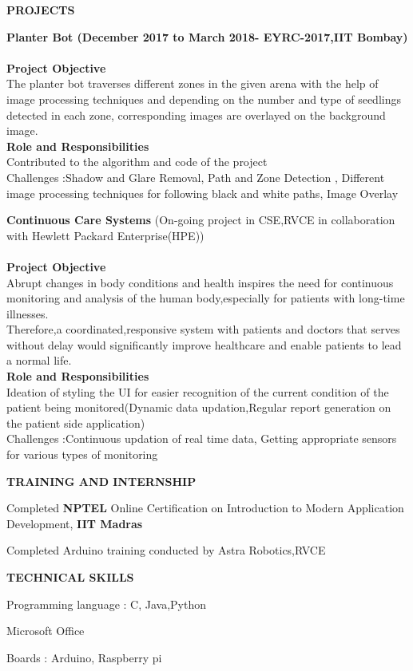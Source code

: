 \documentclass[letterpaper,11pt,oneside]{article}
\begin{document}
\vspace{5ex}

\noindent\textbf{{\normalsize PROJECTS}} \begin{enumerate}
	\item 
	\small {\textbf{Planter Bot (December 2017 to March 2018- EYRC-2017,IIT Bombay)}\\\\
		\textbf{Project Objective}\\
		The planter bot traverses different zones in the given arena with the help of image processing techniques
		and depending on the number and type of seedlings detected in each zone, corresponding images are overlayed on the background image.\\
		\textbf{Role and Responsibilities}\\
		Contributed to the algorithm and code of the project\\
		Challenges :Shadow and Glare Removal, Path and Zone Detection , Different image processing techniques for following black and white paths, Image Overlay
		
		\item \textbf{Continuous Care Systems}
		(On-going project in CSE,RVCE in collaboration with Hewlett Packard Enterprise(HPE))\\\\
		\textbf{Project Objective}\\
		Abrupt changes in body conditions and health inspires the need for continuous monitoring and analysis of the human body,especially for patients with long-time illnesses.\\
		Therefore,a coordinated,responsive system with patients and doctors that serves without delay would significantly improve healthcare and enable patients to lead a normal life.\\
		\textbf{Role and Responsibilities}\\
		Ideation of styling the UI for easier recognition of the current condition of the patient being monitored(Dynamic data updation,Regular report generation on the patient side application)\\
		Challenges :Continuous updation of real time data, Getting appropriate sensors for various types of monitoring
	}
	
\end{enumerate}

\vspace{2ex}

\noindent\textbf{{\normalsize  TRAINING AND INTERNSHIP}} \begin{itemize}
	\small {\item 	Completed \textbf{NPTEL} Online Certification on Introduction to Modern Application Development, \textbf{IIT Madras}
		\item	Completed Arduino training conducted by Astra Robotics,RVCE
	}
\end{itemize}
\vspace{2ex}
\noindent\textbf{{\normalsize  TECHNICAL SKILLS}} 

\begin{enumerate}
	\small {\item Programming language : C, Java,Python
		\item Microsoft Office
		\item Boards :  Arduino, Raspberry pi
	}
\end{enumerate}
\end{document}
